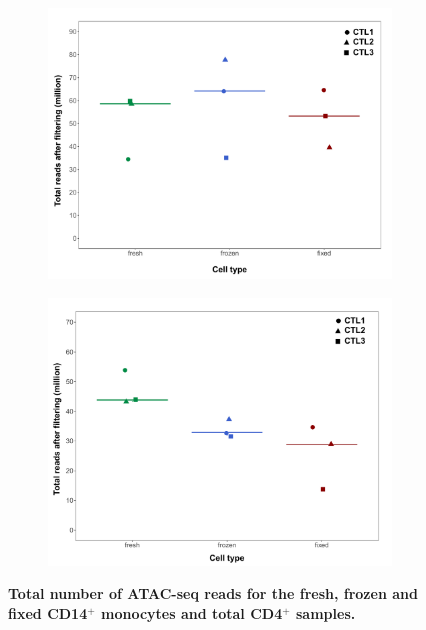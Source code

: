 \begin{figure}[htbp]
\centering
\begin{subfigure}{0.5\textwidth}
\centering
\includegraphics[width=\textwidth]{./Results1/pdfs/Core_ATAC_CD14_fresh_frozen_fixed_filtered_total_reads}
\caption{\textbf{}}
\end{subfigure}%
\begin{subfigure}{0.5\textwidth}
\centering
\includegraphics[width=\textwidth]{./Results1/pdfs/Core_ATAC_CD4_fresh_frozen_fixed_filtered_total_reads}
\caption{\textbf{}}
\end{subfigure}
\caption[Total number of ATAC-seq reads for the fresh, frozen and fixed CD14$^+$ monocytes and total CD4$^+$ samples.]{\textbf{Total number of ATAC-seq reads for the fresh, frozen and fixed CD14$^+$ monocytes and total CD4$^+$ samples.}}
\label{figure:Core_ATAC_all_conditions_total_reads}
\end{figure} 

